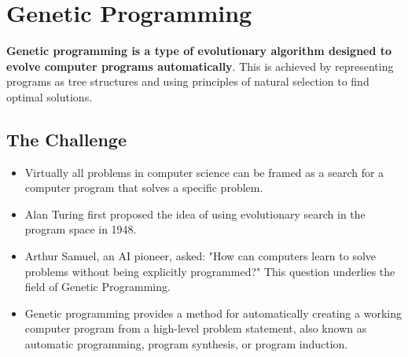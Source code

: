 \section{Genetic Programming}
\textbf{Genetic programming is a type of evolutionary algorithm designed to evolve computer programs automatically}. This is achieved by representing programs as tree structures and using principles of natural selection to find optimal solutions.

\subsection*{The Challenge}
\begin{itemize}
    \item Virtually all problems in computer science can be framed as a search for a computer program that solves a specific problem.
    \item  Alan Turing first proposed the idea of using evolutionary search in the program space in 1948.
   \item Arthur Samuel, an AI pioneer, asked: "How can computers learn to solve problems without being explicitly programmed?" This question underlies the field of Genetic Programming.
    \item Genetic programming provides a method for automatically creating a working computer program from a high-level problem statement, also known as automatic programming, program synthesis, or program induction.
\end{itemize}


